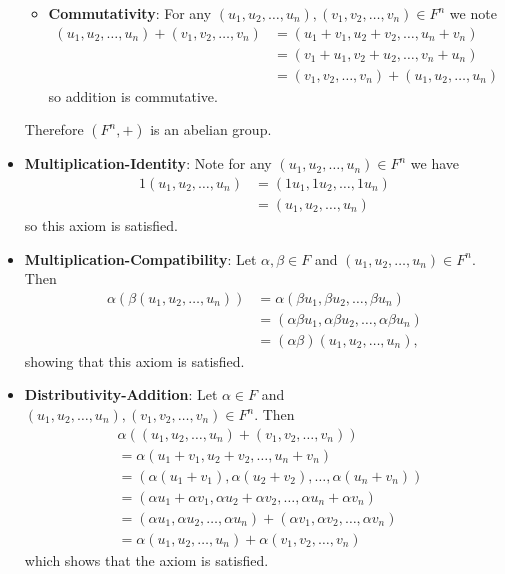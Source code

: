 \begin{questions}
\begin{itemize}
\begin{itemize}
            \item \textbf{Commutativity}: For any $(u_1, u_2, \dots, u_n), (v_1, v_2, \dots, v_n) \in F^n$ we note
            \begin{align*}
                (u_1, u_2, \dots, u_n) + (v_1, v_2, \dots, v_n) &= (u_1 + v_1, u_2 + v_2, \dots, u_n + v_n)\\
                &= (v_1 + u_1, v_2 + u_2, \dots, v_n + u_n)\\
                &= (v_1, v_2, \dots, v_n) + (u_1, u_2, \dots, u_n)
            \end{align*}
            so addition is commutative.
        \end{itemize}
        Therefore $(F^n, +)$ is an abelian group.

        \item \textbf{Multiplication-Identity}: Note for any $(u_1, u_2, \dots, u_n) \in F^n$ we have
        \begin{align*}
            1(u_1, u_2, \dots, u_n) &= (1u_1, 1u_2, \dots, 1u_n)\\
            &= (u_1, u_2, \dots, u_n)
        \end{align*}
        so this axiom is satisfied.

        \item \textbf{Multiplication-Compatibility}: Let $\alpha, \beta \in F$ and $(u_1, u_2, \dots, u_n) \in F^n$. Then
        \begin{align*}
            \alpha(\beta(u_1, u_2, \dots, u_n)) &= \alpha(\beta u_1, \beta u_2, \dots, \beta u_n)\\
            &= (\alpha\beta u_1, \alpha\beta u_2, \dots, \alpha\beta u_n)\\
            &= (\alpha\beta)(u_1, u_2, \dots, u_n),
        \end{align*}
        showing that this axiom is satisfied.

        \item \textbf{Distributivity-Addition}: Let $\alpha \in F$ and $(u_1, u_2, \dots, u_n), (v_1, v_2, \dots, v_n) \in F^n$. Then
        \begin{align*}
            &\alpha((u_1, u_2, \dots, u_n) + (v_1, v_2, \dots, v_n))\\
            &= \alpha(u_1 + v_1, u_2 + v_2, \dots, u_n + v_n)\\
            &= (\alpha(u_1 + v_1), \alpha(u_2 + v_2), \dots, \alpha(u_n + v_n))\\
            &= (\alpha u_1 + \alpha v_1, \alpha u_2 + \alpha v_2, \dots, \alpha u_n + \alpha v_n)\\
            &= (\alpha u_1, \alpha u_2, \dots, \alpha u_n) + (\alpha v_1, \alpha v_2, \dots, \alpha v_n)\\
            &= \alpha(u_1, u_2, \dots, u_n) + \alpha(v_1, v_2, \dots, v_n)
        \end{align*}
        which shows that the axiom is satisfied.


\end{itemize}
\end{questions}
